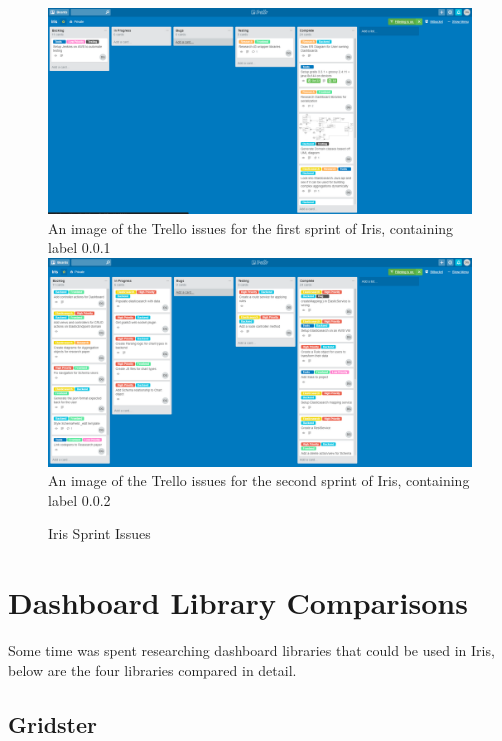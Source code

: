 \documentclass[12pt,a4paper,titlepage]{report}
\begin{document}
\begin{appendices}
\begin{figure}[H]
\begin{tcolorbox}
\includegraphics[width=\textwidth,height=\textheight,keepaspectratio]{trello_sprint_1}
\newline
An image of the Trello issues for the first sprint of Iris, containing label 0.0.1
\newline
\includegraphics[width=\textwidth,height=\textheight,keepaspectratio]{trello_sprint_2}
\newline
An image of the Trello issues for the second sprint of Iris, containing label 0.0.2
\end{tcolorbox}
\caption{Iris Sprint Issues}
\end{figure}

\chapter{Dashboard Library Comparisons}
Some time was spent researching dashboard libraries that could be used in Iris, below are the four libraries compared in detail.

\section{Gridster}


\end{appendices}
\end{document}
